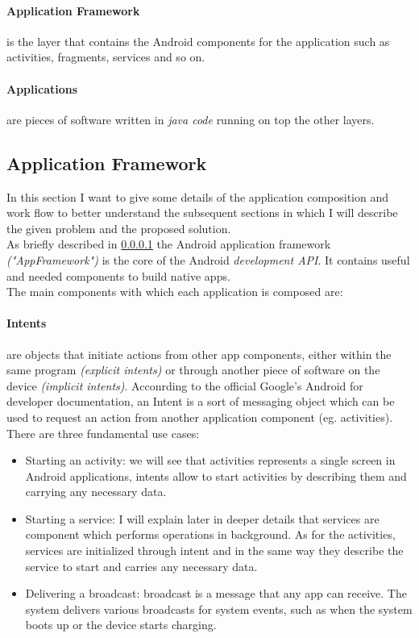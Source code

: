 \paragraph{Application Framework}\label{appframework} is the layer that contains the Android components for the application such as activities, fragments, services and so on. 
\paragraph{Applications} are pieces of software written in \textit{java code} running on top the other layers.

\subsection{Application Framework}
In this section I want to give some details of the application composition and work flow to better understand the subsequent sections in which I will describe the given problem and the proposed solution.\\
As briefly described in \ref{appframework} the Android application framework \textit{("AppFramework")} is the core of the Android \textit{development API}. It contains useful and needed components to build native apps.\\
The main components with which each application is composed are:

\paragraph{Intents} are objects that initiate actions from other app components, either within the same program \textit{(explicit intents)} or through another piece of software on the device \textit{(implicit intents)}.
Acconrding to the official Google's Android for developer documentation, an Intent is a sort of messaging object which can be used to request an action from another application component (eg. activities). There are three fundamental use cases:
\begin{itemize}
	\item Starting an activity: we will see that activities represents a single screen in Android applications, intents allow to start activities by describing them and carrying any necessary data.
	\item Starting a service: I will explain later in deeper details that services are component which performs operations in background. As for the activities, services are initialized through intent and in the same way they describe the service to start and carries any necessary data.
	\item Delivering a broadcast: broadcast is a message that any app can receive. The system delivers various broadcasts for system events, such as when the system boots up or the device starts charging.
\end{itemize}

